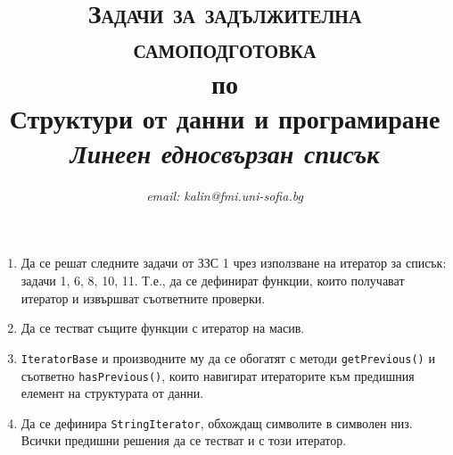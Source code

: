 \documentclass[12pt,a4paper]{article}
\author{\textit{email: kalin@fmi.uni-sofia.bg}}
\title{\textsc{Задачи за задължителна самоподготовка} \\
по \\
Структури от данни и програмиране\\
\textit{Линеен едносвързан списък}}
\newcommand{\code}[1]{\texttt{#1}}
\begin{document}
\maketitle


\begin{enumerate}

	\item  Да се решат следните задачи от ЗЗС 1 чрез използване на итератор за списък: задачи 1, 6, 8, 10, 11. Т.е., да се дефинират функции, които получават итератор и извършват съответните проверки.
	\item Да се тестват същите функции с итератор на масив.

	\item \code{IteratorBase} и производните му да се обогатят с методи \code{getPrevious()} и съответно \code{hasPrevious()}, които навигират итераторите към предишния елемент на структурата от данни.

	\item Да се дефинира \code{StringIterator}, обхождащ символите в символен низ. Всички предишни решения да се тестват и с този итератор.

\end{enumerate}


	\vspace{20px}
\end{document}
